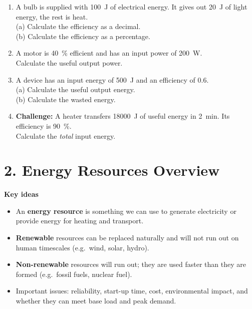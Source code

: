 \documentclass[11pt,a4paper]{article}
\begin{document}
\begin{enumerate}[label=\arabic*)]
    \item A bulb is supplied with \SI{100}{\joule} of electrical energy. It gives out \SI{20}{\joule} of light energy, the rest is heat. \\
    (a) Calculate the efficiency as a decimal. \\
    (b) Calculate the efficiency as a percentage.
    \vspace{3cm}

    \item A motor is \SI{40}{\percent} efficient and has an input power of \SI{200}{\watt}. \\
    Calculate the useful output power.
    \vspace{2.5cm}

    \item A device has an input energy of \SI{500}{\joule} and an efficiency of 0.6. \\
    (a) Calculate the useful output energy. \\
    (b) Calculate the wasted energy.
    \vspace{3cm}

    \item \textbf{Challenge:} A heater transfers \SI{18 000}{\joule} of useful energy in \SI{2}{\minute}. Its efficiency is \SI{90}{\percent}. \\
    Calculate the \emph{total} input energy.
    \vspace{3cm}
\end{enumerate}

\newpage

\section*{2. Energy Resources Overview}

\textbf{Key ideas}

\begin{itemize}[noitemsep]
    \item An \textbf{energy resource} is something we can use to generate electricity or provide energy for heating and transport.
    \item \textbf{Renewable} resources can be replaced naturally and will not run out on human timescales (e.g.\ wind, solar, hydro).
    \item \textbf{Non-renewable} resources will run out; they are used faster than they are formed (e.g.\ fossil fuels, nuclear fuel).
    \item Important issues: reliability, start-up time, cost, environmental impact, and whether they can meet base load and peak demand.
\end{itemize}
\end{document}
